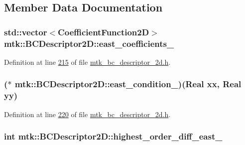 \subsection{Member Data Documentation}
\hypertarget{classmtk_1_1BCDescriptor2D_a1f90fc303984bf18c136a34896bbb7c9}{
\subsubsection[{east\+\_\+coefficients\+\_\+}]{\setlength{\rightskip}{0pt plus 5cm}std\+::vector$<${\bf Coefficient\+Function2\+D}$>$ mtk\+::\+B\+C\+Descriptor2\+D\+::east\+\_\+coefficients\+\_\+\hspace{0.3cm}{\ttfamily [private]}}}\label{classmtk_1_1BCDescriptor2D_a1f90fc303984bf18c136a34896bbb7c9}


Definition at line \hyperlink{mtk__bc__descriptor__2d_8h_source_l00215}{215} of file \hyperlink{mtk__bc__descriptor__2d_8h_source}{mtk\+\_\+bc\+\_\+descriptor\+\_\+2d.\+h}.

\hypertarget{classmtk_1_1BCDescriptor2D_a6cca0c70293203c9d88773e5d5f93418}{
\subsubsection[{east\+\_\+condition\+\_\+}]{($\ast$ mtk\+::\+B\+C\+Descriptor2\+D\+::east\+\_\+condition\+\_\+)({\bf Real} xx, {\bf Real} yy)\hspace{0.3cm}{\ttfamily [private]}}}\label{classmtk_1_1BCDescriptor2D_a6cca0c70293203c9d88773e5d5f93418}


Definition at line \hyperlink{mtk__bc__descriptor__2d_8h_source_l00220}{220} of file \hyperlink{mtk__bc__descriptor__2d_8h_source}{mtk\+\_\+bc\+\_\+descriptor\+\_\+2d.\+h}.

\hypertarget{classmtk_1_1BCDescriptor2D_aea5e539a10d5641bd605ebe583c14bc5}{
\subsubsection[{highest\+\_\+order\+\_\+diff\+\_\+east\+\_\+}]{\setlength{\rightskip}{0pt plus 5cm}int mtk\+::\+B\+C\+Descriptor2\+D\+::highest\+\_\+order\+\_\+diff\+\_\+east\+\_\+\hspace{0.3cm}{\ttfamily [private]}}}\label{classmtk_1_1BCDescriptor2D_aea5e539a10d5641bd605ebe583c14bc5}


